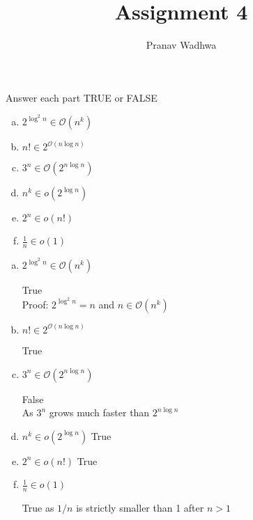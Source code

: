 \documentclass[12pt]{exam}
\title{
  Assignment 4
}
\author{Pranav Wadhwa}
\begin{document}
\maketitle
\noindent


\begin{questions}

  \question{} %
  Answer each part TRUE or FALSE

  \begin{multicols}{2}
  \begin{enumerate}[a.]

    \item $2^{\log^{2}n}\in \mathcal{O}(n^{k})$
    \item $n!\in 2^{\mathcal{O}(n\log n)}$
    \item $3^{n}\in \mathcal{O}(2^{n\log n})$
    \item $n^{k}\in o(2^{\log n})$
    \item $2^{n}\in o(n!)$
    \item $\frac{1}{n} \in o(1)$

  \end{enumerate}
\end{multicols}


\begin{solution}

  \begin{enumerate}[a.]
    \item $2^{\log^{2}n}\in \mathcal{O}(n^{k})$

          True\\
          Proof: $2^{\log^{2}n} = n$ and $n\in \mathcal{O}(n^{k})$
    \item $n!\in 2^{\mathcal{O}(n\log n)}$

          True

    \item $3^{n}\in \mathcal{O}(2^{n\log n})$

          False\\
          As $3^{n}$ grows much faster than $2^{n\log n}$
    \item $n^{k}\in o(2^{\log n})$
          True\\

    \item $2^{n}\in o(n!)$
          True

    \item $\frac{1}{n} \in o(1)$

          True as $1/n$ is strictly smaller than 1 after $n>1$


\end{enumerate}
\end{solution}
\end{questions}
\end{document}
